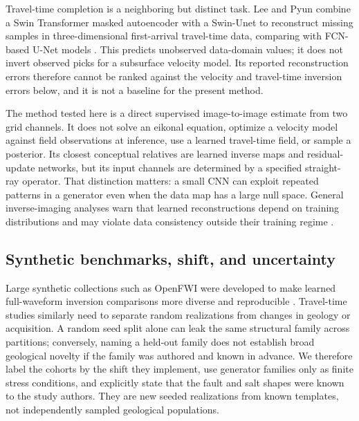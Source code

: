 \documentclass[11pt]{article}
\begin{document}
\noindent\begin{minipage}{\textwidth}
Travel-time completion is a neighboring but distinct task. Lee and Pyun combine a Swin Transformer masked autoencoder with a Swin-Unet to reconstruct missing samples in three-dimensional first-arrival travel-time data, comparing with FCN-based U-Net models \cite{LeePyun2026}. This predicts unobserved data-domain values; it does not invert observed picks for a subsurface velocity model. Its reported reconstruction errors therefore cannot be ranked against the velocity and travel-time inversion errors below, and it is not a baseline for the present method.
\end{minipage}\par

The method tested here is a direct supervised image-to-image estimate from two grid channels. It does not solve an eikonal equation, optimize a velocity model against field observations at inference, use a learned travel-time field, or sample a posterior. Its closest conceptual relatives are learned inverse maps and residual-update networks, but its input channels are determined by a specified straight-ray operator. That distinction matters: a small CNN can exploit repeated patterns in a generator even when the data map has a large null space. General inverse-imaging analyses warn that learned reconstructions depend on training distributions and may violate data consistency outside their training regime \cite{McCann2017,AdlerOktem2018,Ongie2020,Arridge2019}.

\subsection{Synthetic benchmarks, shift, and uncertainty}
\label{sec:related-benchmarks}
Large synthetic collections such as OpenFWI were developed to make learned full-waveform inversion comparisons more diverse and reproducible \cite{Deng2022}. Travel-time studies similarly need to separate random realizations from changes in geology or acquisition. A random seed split alone can leak the same structural family across partitions; conversely, naming a held-out family does not establish broad geological novelty if the family was authored and known in advance. We therefore label the cohorts by the shift they implement, use generator families only as finite stress conditions, and explicitly state that the fault and salt shapes were known to the study authors. They are new seeded realizations from known templates, not independently sampled geological populations.
\end{document}
